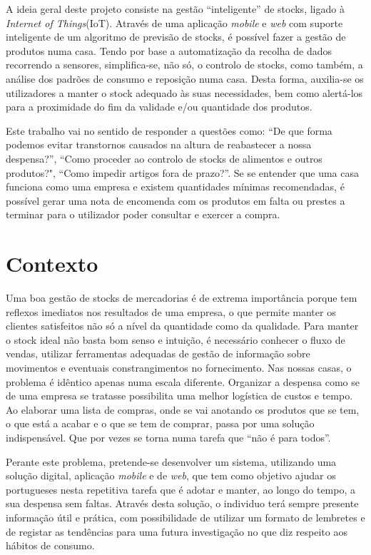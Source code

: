 A ideia geral deste projeto consiste na gestão ``inteligente'' de stocks, ligado à \textit{Internet of Things}(IoT). Através de uma aplicação \textit{mobile} e \textit{web} com suporte inteligente de um algoritmo de previsão de stocks, é possível fazer a gestão de produtos numa casa. Tendo por base a automatização da recolha de dados recorrendo a sensores, simplifica-se, não só, o controlo de stocks, como também, a análise dos padrões de consumo e reposição numa casa.
Desta forma, auxilia-se os utilizadores a manter o stock adequado às suas necessidades, bem como alertá-los para a proximidade do fim da validade e/ou quantidade dos produtos. 

Este trabalho vai no sentido de responder a questões como: ``De que forma podemos evitar transtornos causados na altura de reabastecer a nossa despensa?'', ``Como proceder ao controlo de stocks de alimentos e outros produtos?", ``Como impedir artigos fora de prazo?''. Se se entender que uma casa funciona como uma empresa e existem quantidades mínimas recomendadas, é possível gerar uma nota de encomenda com os produtos em falta ou prestes a terminar para o utilizador poder consultar e exercer a compra.

%
%
\section{Contexto} \label{sec11}

Uma boa gestão de stocks de mercadorias é de extrema importância porque tem reflexos imediatos nos resultados de uma empresa, o que permite manter os clientes satisfeitos não só a nível da quantidade como da qualidade. Para manter o stock ideal não basta bom senso e intuição, é necessário conhecer o fluxo de vendas, utilizar ferramentas adequadas de gestão de informação sobre movimentos e eventuais constrangimentos no fornecimento. Nas nossas casas, o problema é idêntico apenas numa escala diferente. Organizar a despensa como se de uma empresa se tratasse possibilita uma melhor logística de custos e tempo. Ao elaborar uma lista de compras, onde se vai anotando os produtos que se tem, o que está a acabar e o que se tem de comprar, passa por uma solução indispensável. Que por vezes se torna numa tarefa que ``não é para todos''.

Perante este problema, pretende-se desenvolver um sistema, utilizando uma solução digital, aplicação \textit{mobile} e de \textit{web}, que tem como objetivo ajudar os portugueses nesta repetitiva tarefa que é adotar e manter, ao longo do tempo, a sua despensa sem faltas.
Através desta solução, o individuo terá sempre presente informação útil e prática, com possibilidade de utilizar um formato de lembretes e de registar as tendências para uma futura investigação no que diz respeito aos hábitos de consumo.

